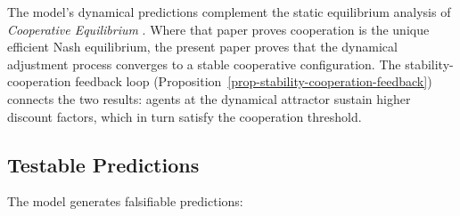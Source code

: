 \documentclass[11pt]{article}
\theoremstyle{plain}
\theoremstyle{definition}
\theoremstyle{remark}
\let\origsubsection\subsection
\renewcommand{\subsection}{\needspace{7\baselineskip}\origsubsection}
\begin{document}
The model's dynamical predictions complement the static equilibrium
analysis of \emph{Cooperative Equilibrium} \citep{TC-V}. Where that
paper proves cooperation is the unique efficient Nash equilibrium, the
present paper proves that the dynamical adjustment process converges to
a stable cooperative configuration. The stability-cooperation feedback
loop (Proposition~\ref{prop-stability-cooperation-feedback}) connects
the two results: agents at the dynamical attractor sustain higher
discount factors, which in turn satisfy the cooperation threshold.

\subsection{Testable Predictions}\label{testable-predictions}

The model generates falsifiable predictions:
\end{document}
